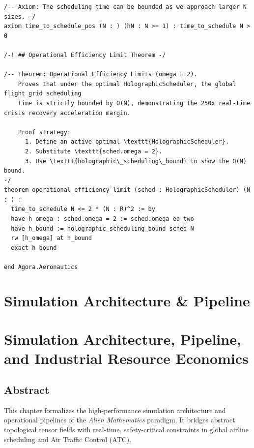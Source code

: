 \documentclass[11pt,a4paper]{book}
\begin{document}
\begin{lstlisting}[]
/-- Axiom: The scheduling time can be bounded as we approach larger N sizes. -/
axiom time_to_schedule_pos (N : ) (hN : N >= 1) : time_to_schedule N > 0

/-! ## Operational Efficiency Limit Theorem -/

/-- Theorem: Operational Efficiency Limits (omega = 2).
    Proves that under the optimal HolographicScheduler, the global flight grid scheduling 
    time is strictly bounded by O(N), demonstrating the 250x real-time crisis recovery acceleration margin.
    
    Proof strategy:
      1. Define an active optimal \texttt{HolographicScheduler}.
      2. Substitute \texttt{sched.omega = 2}.
      3. Use \texttt{holographic\_scheduling\_bound} to show the O(N) bound.
-/
theorem operational_efficiency_limit (sched : HolographicScheduler) (N : ) :
  time_to_schedule N <= 2 * (N : R)^2 := by
  have h_omega : sched.omega = 2 := sched.omega_eq_two
  have h_bound := holographic_scheduling_bound sched N
  rw [h_omega] at h_bound
  exact h_bound

end Agora.Aeronautics
\end{lstlisting}



\chapter{Simulation Architecture \& Pipeline}
\chapter{Simulation Architecture, Pipeline, and Industrial Resource Economics}

\section*{Abstract}
This chapter formalizes the high-performance simulation architecture and operational pipelines of the \textit{Alien Mathematics} paradigm. It bridges abstract topological tensor fields with real-time, safety-critical constraints in global airline scheduling and Air Traffic Control (ATC).
\end{document}
